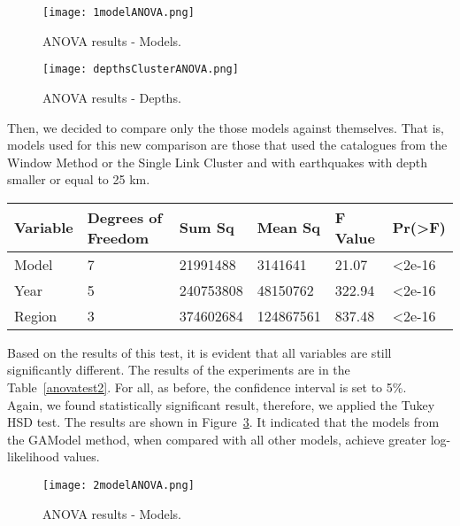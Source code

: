 \begin{figure}[H]
	\centering
	\texttt{[image: 1modelANOVA.png]}
	\caption{ANOVA results - Models.}
	\label{modelANOVA}
\end{figure}

\begin{figure}[H]
	\centering
	\texttt{[image: depthsClusterANOVA.png]}
	\caption{ANOVA results - Depths.}
	\label{depthsANOVA}
\end{figure}

Then, we decided to compare only the those models against themselves. That is, models used for this new comparison are those that used the catalogues from the Window Method or the Single Link Cluster and with earthquakes with depth smaller or equal to 25 km.\\

\begin{table*}[!ht]
	\centering
	\begin{tabular}{|l|l|l|l|l|l|}
		\hline
		{Variable} & {Degrees of Freedom} & {Sum Sq}    & {Mean Sq}   & {F Value} & {Pr(\textgreater F)} \\
		\hline
		Model    & 7            	  & 21991488   & 3141641    & 21.07     & \textless2e-16     \\
		\hline
		Year     & 5                  & 240753808  & 48150762   & 322.94    & \textless2e-16     \\
		\hline
		Region   & 3                  & 374602684  & 124867561  & 837.48    & \textless2e-16	\\    
		\hline
	\end{tabular}
	\caption{Simple ANOVA Test Results.}
	\label{anovatest2}
\end{table*}

Based on the results of this test, it is evident that all variables are still significantly different. The results of the experiments are in the Table~\ref{anovatest2}. For all, as before, the confidence interval is set to 5\%.\\


Again, we found statistically significant result, therefore, we applied the Tukey HSD test. The results are shown in Figure~\ref{modelANOVA2}. It indicated that the models from the GAModel method, when compared with all other models, achieve greater log-likelihood values.\\

\begin{figure}[H]
	\centering
	\texttt{[image: 2modelANOVA.png]}
	\caption{ANOVA results - Models.}
	\label{modelANOVA2}
\end{figure}

